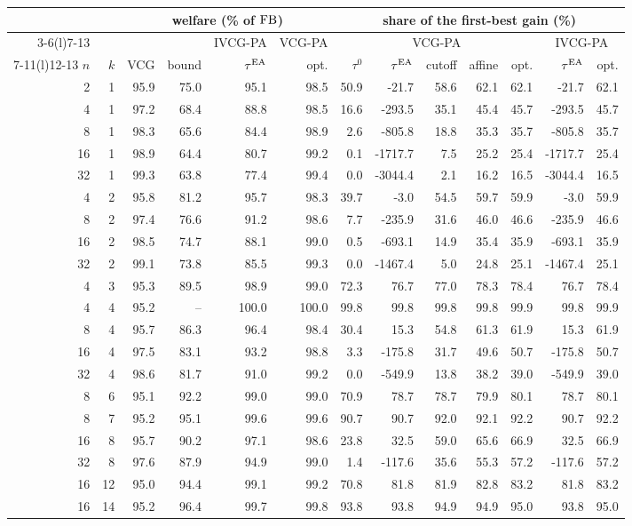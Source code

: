 \begin{tabular}{@{}rrrrrrrrrrrrr@{}}
\toprule
 & & \multicolumn{4}{c}{welfare (\% of $\mathrm{FB}$)} & \multicolumn{7}{c}{share of the first-best gain (\%)}\\
\cmidrule(lr){3-6}\cmidrule(l){7-13}
 & & & & IVCG-PA & VCG-PA & \multicolumn{5}{c}{VCG-PA} & \multicolumn{2}{c}{IVCG-PA}\\
\cmidrule(lr){7-11}\cmidrule(l){12-13}
$n$ & $k$ & VCG & bound & $\tau^{\mathrm{EA}}$ & opt. & $\tau^0$ & $\tau^{\mathrm{EA}}$ & cutoff & affine & opt. & $\tau^{\mathrm{EA}}$ & opt.\\
\midrule
2 & 1 & 95.9 & 75.0 & 95.1 & 98.5 & 50.9 & -21.7 & 58.6 & 62.1 & 62.1 & -21.7 & 62.1 \\
4 & 1 & 97.2 & 68.4 & 88.8 & 98.5 & 16.6 & -293.5 & 35.1 & 45.4 & 45.7 & -293.5 & 45.7 \\
8 & 1 & 98.3 & 65.6 & 84.4 & 98.9 & 2.6 & -805.8 & 18.8 & 35.3 & 35.7 & -805.8 & 35.7 \\
16 & 1 & 98.9 & 64.4 & 80.7 & 99.2 & 0.1 & -1717.7 & 7.5 & 25.2 & 25.4 & -1717.7 & 25.4 \\
32 & 1 & 99.3 & 63.8 & 77.4 & 99.4 & 0.0 & -3044.4 & 2.1 & 16.2 & 16.5 & -3044.4 & 16.5 \\
4 & 2 & 95.8 & 81.2 & 95.7 & 98.3 & 39.7 & -3.0 & 54.5 & 59.7 & 59.9 & -3.0 & 59.9 \\
8 & 2 & 97.4 & 76.6 & 91.2 & 98.6 & 7.7 & -235.9 & 31.6 & 46.0 & 46.6 & -235.9 & 46.6 \\
16 & 2 & 98.5 & 74.7 & 88.1 & 99.0 & 0.5 & -693.1 & 14.9 & 35.4 & 35.9 & -693.1 & 35.9 \\
32 & 2 & 99.1 & 73.8 & 85.5 & 99.3 & 0.0 & -1467.4 & 5.0 & 24.8 & 25.1 & -1467.4 & 25.1 \\
4 & 3 & 95.3 & 89.5 & 98.9 & 99.0 & 72.3 & 76.7 & 77.0 & 78.3 & 78.4 & 76.7 & 78.4 \\
4 & 4 & 95.2 & -- & 100.0 & 100.0 & 99.8 & 99.8 & 99.8 & 99.8 & 99.9 & 99.8 & 99.9 \\
8 & 4 & 95.7 & 86.3 & 96.4 & 98.4 & 30.4 & 15.3 & 54.8 & 61.3 & 61.9 & 15.3 & 61.9 \\
16 & 4 & 97.5 & 83.1 & 93.2 & 98.8 & 3.3 & -175.8 & 31.7 & 49.6 & 50.7 & -175.8 & 50.7 \\
32 & 4 & 98.6 & 81.7 & 91.0 & 99.2 & 0.0 & -549.9 & 13.8 & 38.2 & 39.0 & -549.9 & 39.0 \\
8 & 6 & 95.1 & 92.2 & 99.0 & 99.0 & 70.9 & 78.7 & 78.7 & 79.9 & 80.1 & 78.7 & 80.1 \\
8 & 7 & 95.2 & 95.1 & 99.6 & 99.6 & 90.7 & 90.7 & 92.0 & 92.1 & 92.2 & 90.7 & 92.2 \\
16 & 8 & 95.7 & 90.2 & 97.1 & 98.6 & 23.8 & 32.5 & 59.0 & 65.6 & 66.9 & 32.5 & 66.9 \\
32 & 8 & 97.6 & 87.9 & 94.9 & 99.0 & 1.4 & -117.6 & 35.6 & 55.3 & 57.2 & -117.6 & 57.2 \\
16 & 12 & 95.0 & 94.4 & 99.1 & 99.2 & 70.8 & 81.8 & 81.9 & 82.8 & 83.2 & 81.8 & 83.2 \\
16 & 14 & 95.2 & 96.4 & 99.7 & 99.8 & 93.8 & 93.8 & 94.9 & 94.9 & 95.0 & 93.8 & 95.0 \\
\bottomrule
\end{tabular}
